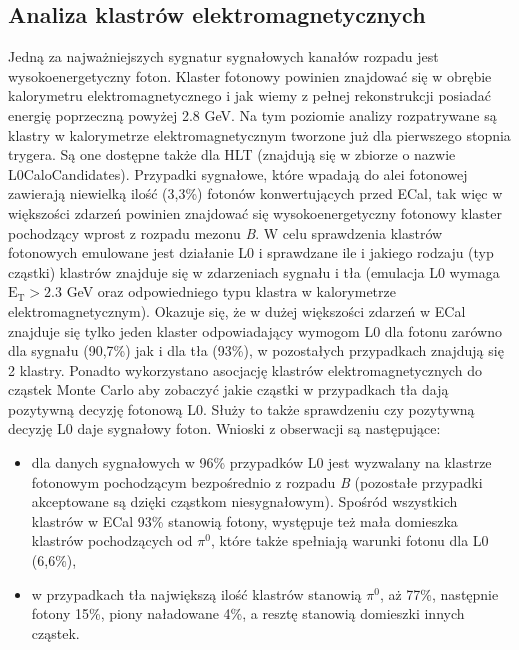 \documentclass{pracamgr}
\begin{document}
\subsection{Analiza klastrów elektromagnetycznych}
Jedną za najważniejszych sygnatur sygnałowych kanałów rozpadu jest wysokoenergetyczny foton. Klaster fotonowy powinien znajdować się w obrębie kalorymetru elektromagnetycznego i jak wiemy z pełnej rekonstrukcji posiadać energię poprzeczną powyżej 2.8 GeV. Na tym poziomie analizy rozpatrywane są klastry w kalorymetrze elektromagnetycznym tworzone już dla pierwszego stopnia trygera. Są one dostępne także dla HLT (znajdują się w zbiorze o nazwie L0CaloCandidates). Przypadki sygnałowe, które wpadają do alei fotonowej zawierają niewielką ilość (3,3\%) fotonów konwertujących przed ECal, tak więc w większości zdarzeń powinien znajdować się wysokoenergetyczny fotonowy klaster pochodzący wprost z rozpadu mezonu \textit{B}. W celu sprawdzenia klastrów fotonowych emulowane jest działanie L0 i sprawdzane ile i jakiego rodzaju (typ cząstki) klastrów znajduje się w zdarzeniach sygnału i tła (emulacja L0 wymaga $\mathrm{E_T>2.3}$ GeV oraz odpowiedniego typu klastra w kalorymetrze elektromagnetycznym). Okazuje się, że w dużej większości zdarzeń w ECal znajduje się tylko jeden klaster odpowiadający wymogom L0 dla fotonu zarówno dla sygnału (90,7\%) jak i dla tła (93\%), w pozostałych przypadkach znajdują się 2 klastry. Ponadto wykorzystano asocjację klastrów elektromagnetycznych do cząstek Monte Carlo aby zobaczyć jakie cząstki w przypadkach tła dają pozytywną decyzję fotonową L0. Służy to także sprawdzeniu czy pozytywną decyzję L0 daje sygnałowy foton. Wnioski z obserwacji są następujące:
\begin{itemize}
 \item dla danych sygnałowych w 96\% przypadków L0 jest wyzwalany na klastrze fotonowym pochodzącym bezpośrednio z rozpadu \textit{B} (pozostałe przypadki akceptowane są dzięki cząstkom niesygnałowym). Spośród wszystkich klastrów w ECal 93\% stanowią fotony, występuje też mała domieszka klastrów pochodzących od $\pi^0$, które także spełniają warunki fotonu dla L0 (6,6\%),
 \item w przypadkach tła największą ilość klastrów stanowią $\pi^0$, aż 77\%, następnie fotony 15\%, piony naładowane 4\%, a resztę stanowią domieszki innych cząstek.
\end{itemize}
 
\end{document}

